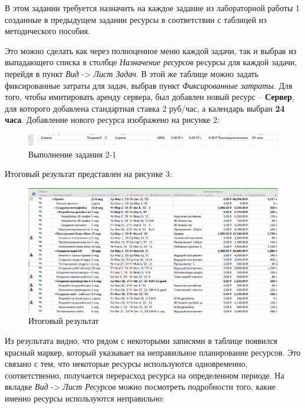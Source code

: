 В этом задании требуется назначить на каждое задание из лабораторной работы 1 созданные в предыдущем задании ресурсы в соответствии с таблицей из методического пособия.

Это можно сделать как через полноценное меню каждой задачи, так и выбрав из выпадающего списка в столбце \textit{Назначение ресурсов} ресурсы для каждой задачи, перейдя в пункт \textit{Вид} -> \textit{Лист Задач}.
В этой же таблице можно задать фиксированные затраты для задач, выбрав пункт \textit{Фиксированные затраты}.
Для того, чтобы имитировать аренду сервера, был добавлен новый ресурс – \textbf{Сервер}, для которого добавлена стандартная ставка 2 руб/час, а календарь выбран \textbf{24 часа}.
Добавление нового ресурса изображено на рисунке 2:
\FloatBarrier
\begin{figure}[h]	
	\begin{center}
		\includegraphics[width=\linewidth]{inc/2.png}
	\end{center}
	\captionsetup{justification=centering}
	\caption{Выполнение задания 2-1}
\end{figure}
\FloatBarrier

Итоговый результат представлен на рисунке 3:
\FloatBarrier
\begin{figure}[h]	
	\begin{center}
		\includegraphics[width=\linewidth]{inc/new.png}
	\end{center}
	\captionsetup{justification=centering}
	\caption{Итоговый результат}
\end{figure}
\FloatBarrier

Из результата видно, что рядом с некоторыми записями в таблице появился красный маркер, который указывает на неправильное планирование ресурсов.
Это связано с тем, что некоторые ресурсы используются одновременно, соответственно, получается перерасход ресурса на определенном периоде.
На вкладке \textit{Вид} -> \textit{Лист Ресурсов} можно посмотреть подробности того, какие именно ресурсы используются неправильно:

